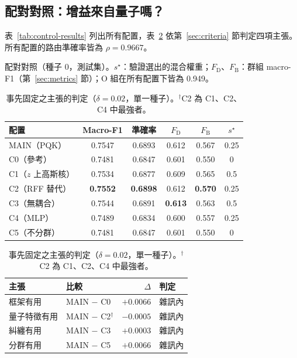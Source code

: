 \documentclass[10pt,a4paper]{article}
\begin{document}
\subsection{配對對照：增益來自量子嗎？}
\label{sec:res-controls}

表~\ref{tab:control-results} 列出所有配置，表~\ref{tab:claims} 依第~\ref{sec:criteria} 節判定四項主張。所有配置的路由準確率皆為 $\rho=0.9667$。

\begin{table}[!ht]
    \centering
    \begin{minipage}[t]{0.50\textwidth}
    \centering
    \caption{配對對照（種子 0，測試集）。$s^\star$：驗證選出的混合權重；$F_{\mathrm{D}}$、$F_{\mathrm{B}}$：群組 macro-F1（第~\ref{sec:metrics} 節）；O 組在所有配置下皆為 0.949。}
    \label{tab:control-results}
    \footnotesize
    \setlength{\tabcolsep}{4pt}
    \renewcommand{\arraystretch}{1.12}
    \begin{tabular*}{\linewidth}{@{\extracolsep{\fill}}lccccc@{}}
        \toprule
        配置 & Macro-F1 & 準確率 & $F_{\mathrm{D}}$ & $F_{\mathrm{B}}$ & $s^\star$ \\
        \midrule
        \rowcolor{blue!10} MAIN（PQK） & 0.7547 & 0.6893 & 0.612 & 0.567 & 0.25 \\
        C0（參考） & 0.7481 & 0.6847 & 0.601 & 0.550 & 0 \\
        C1（$z$ 上高斯核） & 0.7534 & 0.6877 & 0.609 & 0.565 & 0.5 \\
        C2（RFF 替代） & \textbf{0.7552} & \textbf{0.6898} & 0.612 & \textbf{0.570} & 0.25 \\
        C3（無耦合） & 0.7544 & 0.6891 & \textbf{0.613} & 0.563 & 0.5 \\
        C4（MLP） & 0.7489 & 0.6834 & 0.600 & 0.557 & 0.25 \\
        C5（不分群） & 0.7481 & 0.6847 & 0.601 & 0.550 & 0 \\
        \bottomrule
    \end{tabular*}
    \end{minipage}\hfill
    \begin{minipage}[t]{0.46\textwidth}
    \centering
    \caption{事先固定之主張的判定（$\delta=0.02$，單一種子）。$^{\dagger}$C2 為 C1、C2、C4 中最強者。}
    \label{tab:claims}
    \footnotesize
    \setlength{\tabcolsep}{3pt}
    \renewcommand{\arraystretch}{1.12}
    \begin{tabular*}{\linewidth}{@{\extracolsep{\fill}}llrl@{}}
        \toprule
        主張 & 比較 & $\Delta$ & 判定 \\
        \midrule
        框架有用 & MAIN $-$ C0 & $+0.0066$ & 雜訊內 \\
        量子特徵有用 & MAIN $-$ C2$^{\dagger}$ & $-0.0005$ & 雜訊內 \\
        糾纏有用 & MAIN $-$ C3 & $+0.0003$ & 雜訊內 \\
        分群有用 & MAIN $-$ C5 & $+0.0066$ & 雜訊內 \\
        \bottomrule
    \end{tabular*}
    \end{minipage}
\end{table}
\end{document}
